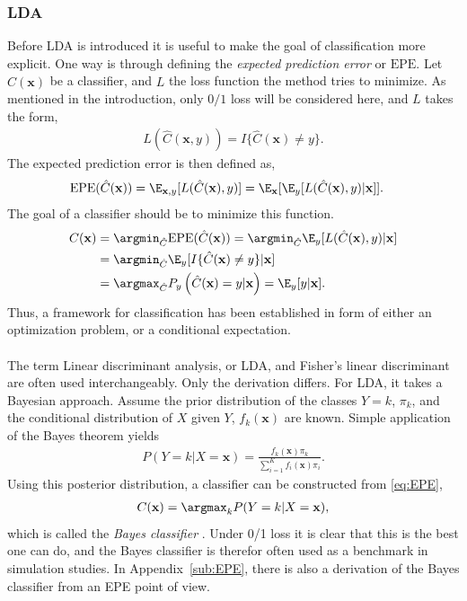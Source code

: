 \subsubsection{LDA}
\label{sub:LDA}
Before LDA is introduced it is useful to make the goal of classification more explicit. One way is through defining the \textit{expected prediction error} or $\mathrm{EPE}$.
Let $\hat C(\mathbf{x})$ be a classifier, and $L$ the loss function the method tries to minimize. As mentioned in the introduction, only $0/1$ loss will be considered here, and $L$ takes the form,
\begin{align}
  L(\hat C(\mathbf{x}, y)) = I\{ \hat C(\mathbf{x}) \neq y \}. 
\end{align}
The expected prediction error is then defined as,
\begin{align}
  \mathrm{EPE}(\hat C(\mathbf{x})) 
  &= \E_{\mathbf{x}, y}[L(\hat C(\mathbf{x}), y)] = \E_{\mathbf{x}}[\E_{y}[L(\hat C(\mathbf{x}), y) | \mathbf{x}]].
\end{align}
The goal of a classifier should be to minimize this function.
\begin{align}
  C(\mathbf{x}) 
  &= \argmin_{\hat C} \mathrm{EPE}(\hat C(\mathbf{x})) = \argmin_{\hat C} \E_{y}[L(\hat C(\mathbf{x}), y) | \mathbf{x}] \notag \\
  &= \argmin_{\hat C} \E_{y}[I\{\hat C(\mathbf{x}) \neq y \} | \mathbf{x}] \notag \\
  \label{eq:EPE} 
  &= \argmax_{\hat C} P_{y}\left(\hat C(\mathbf{x}) = y  | \mathbf{x}  \right) = \E_y [y | \mathbf{x}].
\end{align}
Thus, a framework for classification has been established in form of either an optimization problem, or a conditional expectation.
\\
\\
The term Linear discriminant analysis, or LDA, and Fisher's linear discriminant are often used interchangeably. Only the derivation differs. For LDA, it takes a Bayesian approach. 
Assume the prior distribution of the classes $Y=k$, $\pi_k$, and the conditional distribution of $X$ given $Y$, $f_k(\mathbf{x})$ are known. Simple application of the Bayes theorem yields 
\begin{align}
  P(Y=k|X=\mathbf{x}) = \frac{f_k(\mathbf{x}) \pi_k}{\sum^{K}_{i=1} f_i(\mathbf{x})\pi_i} .
\end{align}
Using this posterior distribution, a classifier can be constructed from \eqref{eq:EPE},
\begin{align}
  \label{eq:bayesian} 
  C(\mathbf{x}) = \argmax_k P(Y=k|X=\mathbf{x}),
\end{align}
which is called the \textit{Bayes classifier} \cite[p.~21]{modstat}. Under 0/1 loss it is clear that this is the best one can do, and the Bayes classifier is therefor often used as a benchmark in simulation studies. In Appendix~\ref{sub:EPE}, there is also a derivation of the Bayes classifier from an EPE point of view. 

